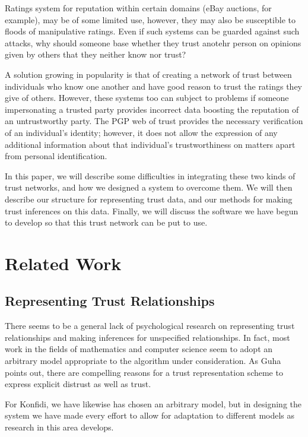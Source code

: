 \documentclass[onecolumn]{acm_proc_article-sp}
\begin{document}
Ratings system for reputation within certain domains (eBay auctions, for example), may be of some limited use, however, they may also be susceptible to floods of manipulative ratings.  Even if such systems can be guarded against such attacks, why should someone base whether they trust anotehr person on opinions given by others that they neither know nor trust?

A solution growing in popularity is that of creating a network of trust between individuals who know one another and have good reason to trust the ratings they give of others.  However, these systems too can subject to problems if someone impersonating a trusted party provides incorrect data boosting the reputation of an untrustworthy party.  The PGP web of trust provides the necessary verification of an individual's identity; however, it does not allow the expression of any additional information about that individual's trustworthiness on matters apart from personal identification.

In this paper, we will describe some difficulties in integrating these two kinds of trust networks, and how we designed a system to overcome them.  We will then describe our structure for representing trust data, and our methods for making trust inferences on this data.  Finally, we will discuss the software we have begun to develop so that this trust network can be put to use.

\section{Related Work}

\subsection{Representing Trust Relationships}
There seems to be a general lack of psychological research on representing trust relationships and making inferences for unspecified relationships. In fact, most work in the fields of mathematics and computer science seem to adopt an arbitrary model appropriate to the algorithm under consideration. As Guha points out\cite{guha04propagation}, there are compelling reasons for a trust representation scheme to express explicit distrust as well as trust.

For Konfidi, we have likewise has chosen an arbitrary model, but in designing the system we have made every effort to allow for adaptation to different models as research in this area develops. 
\end{document}
